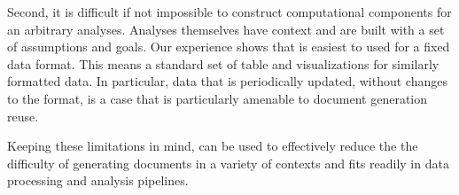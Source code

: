 \documentclass[
]{jss}
\begin{document}
Second, it is difficult if not impossible to construct computational
components for an arbitrary analyses. Analyses themselves have context
and are built with a set of assumptions and goals. Our experience shows
that  is easiest to used for a fixed data format. This
means a standard set of table and visualizations for similarly formatted
data. In particular, data that is periodically updated, without changes
to the format, is a case that is particularly amenable to document
generation reuse.

Keeping these limitations in mind,  can be used to
effectively reduce the the difficulty of generating documents in a
variety of contexts and fits readily in data processing and analysis
pipelines.


\end{document}
